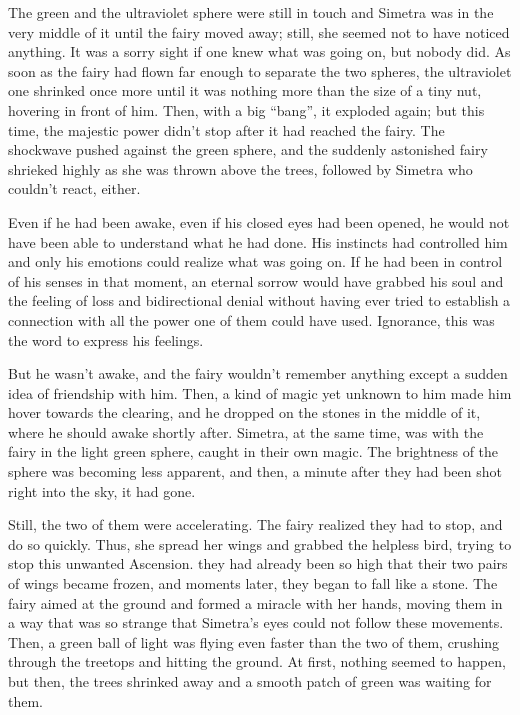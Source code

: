 The green and the ultraviolet sphere were still in touch and Simetra was in the very middle of it until the fairy moved away; still, she seemed not to have noticed anything. It was a sorry sight if one knew what was going on, but nobody did. 
As soon as the fairy had flown far enough to separate the two spheres, the ultraviolet one shrinked once more until it was nothing more than the size of a tiny nut, hovering in front of him. 
Then, with a big \enquote{bang}, it exploded again; but this time, the majestic power didn't stop after it had reached the fairy. The shockwave pushed against the green sphere, and the suddenly astonished fairy shrieked highly as she was thrown above the trees, followed by Simetra who couldn't react, either.

Even if he had been awake, even if his closed eyes had been opened, he would not have been able to understand what he had done. His instincts had controlled him and only his emotions could realize what was going on. If he had been in control of his senses in that moment, an eternal sorrow would have grabbed his soul and the feeling of loss and bidirectional denial without having ever tried to establish a connection with all the power one of them could have used. Ignorance, this was the word to express his feelings.

But he wasn't awake, and the fairy wouldn't remember anything except a sudden idea of friendship with him. 
Then, a kind of magic yet unknown to him made him hover towards the clearing, and he dropped on the stones in the middle of it, where he should awake shortly after. 
Simetra, at the same time, was with the fairy in the light green sphere, caught in their own magic. The brightness of the sphere was becoming less apparent, and then, a minute after they had been shot right into the sky, it had gone.

Still, the two of them were accelerating. The fairy realized they had to stop, and do so quickly. Thus, she spread her wings and grabbed the helpless bird, trying to stop this unwanted Ascension. they had already been so high that their two pairs of wings became frozen, and moments later, they began to fall like a stone. The fairy aimed at the ground and formed a miracle with her hands, moving them in a way that was so strange that Simetra's eyes could not follow these movements. Then, a green ball of light was flying even faster than the two of them, crushing through the treetops and hitting the ground. At first, nothing seemed to happen, but then, the trees shrinked away and a smooth patch of green was waiting for them. 

